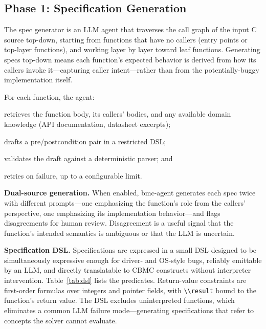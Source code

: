 \documentclass[11pt,a4paper]{article}
\newcommand{\tool}{bmc-agent\xspace}
\begin{document}
\subsection{Phase 1: Specification Generation}
\label{sec:specgen}

The spec generator is an LLM agent that traverses the call graph of the input
C source top-down, starting from functions that have no callers (entry points
or top-layer functions), and working layer by layer toward leaf functions.
Generating specs top-down means each function's expected behavior is derived
from how its callers invoke it---capturing caller intent---rather than from the
potentially-buggy implementation itself.

For each function, the agent:
\begin{enumerate*}[label=(\roman*)]
  \item retrieves the function body, its callers' bodies, and any available
  domain knowledge (API documentation, datasheet excerpts);
  \item drafts a pre/postcondition pair in a restricted DSL;
  \item validates the draft against a deterministic parser; and
  \item retries on failure, up to a configurable limit.
\end{enumerate*}

\smallskip\noindent\textbf{Dual-source generation.}
When enabled, \tool generates each spec twice with different prompts---one
emphasizing the function's role from the callers' perspective, one emphasizing
its implementation behavior---and flags disagreements for human review.
Disagreement is a useful signal that the function's intended semantics is
ambiguous or that the LLM is uncertain.

\smallskip\noindent\textbf{Specification DSL.}
Specifications are expressed in a small DSL designed to be simultaneously
expressive enough for driver- and OS-style bugs, reliably emittable by an LLM,
and directly translatable to CBMC constructs without interpreter intervention.
Table~\ref{tab:dsl} lists the predicates. Return-value
constraints are first-order formulas over integers and pointer fields, with
\lstinline{\\result} bound to the function's return value.
The DSL excludes uninterpreted functions, which eliminates a common LLM failure
mode---generating specifications that refer to concepts the solver cannot
evaluate.
\end{document}
